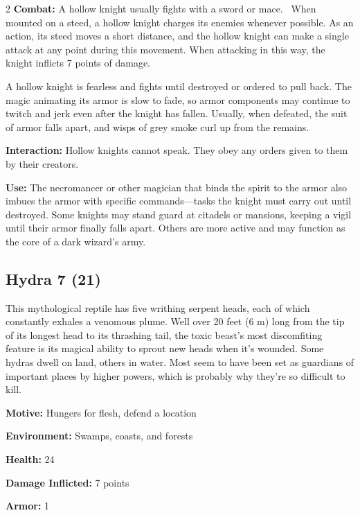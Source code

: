 \begin{multicols}{2}
\textbf{Combat:} A hollow knight usually fights with a sword or mace. 
When mounted on a steed, a hollow knight charges its enemies whenever possible. As an action, its steed moves a short distance, and the hollow knight can make a single attack at any point during this movement. When attacking in this way, the knight inflicts 7 points of damage. 

A hollow knight is fearless and fights until destroyed or ordered to pull back. The magic animating its armor is slow to fade, so armor components may continue to twitch and jerk even after the knight has fallen. Usually, when defeated, the suit of armor falls apart, and wisps of grey smoke curl up from the remains. 

\textbf{Interaction:} Hollow knights cannot speak. They obey any orders given to them by their creators. 

\textbf{Use:} The necromancer or other magician that binds the spirit to the armor also imbues the armor with specific commands—tasks the knight must carry out until destroyed. Some knights may stand guard at citadels or mansions, keeping a vigil until their armor finally falls apart. Others are more active and may function as the core of a dark wizard’s army.

\subsection{Hydra 7 (21)}

This mythological reptile has five writhing serpent heads, each of which constantly exhales a venomous plume. Well over 20 feet (6 m) long from the tip of its longest head to its thrashing tail, the toxic beast’s most discomfiting feature is its magical ability to sprout new heads when it’s wounded. Some hydras dwell on land, others in water. Most seem to have been set as guardians of important places by higher powers, which is probably why they’re so difficult to kill. 

\textbf{Motive:} Hungers for flesh, defend a location 

\textbf{Environment:} Swamps, coasts, and forests 

\textbf{Health:} 24 

\textbf{Damage Inflicted:} 7 points 

\textbf{Armor:} 1 


\end{multicols}

